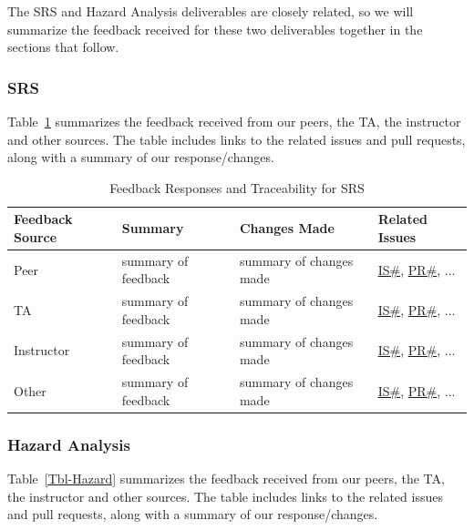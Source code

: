 \documentclass{article}
\begin{document}
The SRS and Hazard Analysis deliverables are closely related, so we will
summarize the feedback received for these two deliverables together in the
sections that follow.

\subsubsection{SRS}

Table~\ref{Tbl-SRS} summarizes the feedback received from our peers, the TA, the
instructor and other sources.  The table includes links to the related issues
and pull requests, along with a summary of our response/changes.

\begin{longtable}{|p{2cm}|p{4cm}|p{5cm}|p{4cm}|}
\caption{Feedback Responses and Traceability for SRS}
\label{Tbl-SRS}\\

\hline
\textbf{Feedback Source} & \textbf{Summary} & \textbf{Changes Made} & \textbf{Related Issues} \\ 
\hline
\endhead

Peer & summary of feedback & summary of changes made & \href{link}{IS\#}, \href{link}{PR\#}, ... \\
\hline
TA & summary of feedback & summary of changes made & \href{link}{IS\#}, \href{link}{PR\#}, ... \\
\hline
Instructor & summary of feedback & summary of changes made & \href{link}{IS\#}, \href{link}{PR\#}, ... \\
\hline
Other & summary of feedback & summary of changes made & \href{link}{IS\#}, \href{link}{PR\#}, ... \\
\hline
\end{longtable}

\subsubsection{Hazard Analysis}

Table~\ref{Tbl-Hazard} summarizes the feedback received from our peers, the TA,
the instructor and other sources.  The table includes links to the related
issues and pull requests, along with a summary of our response/changes.
\end{document}
